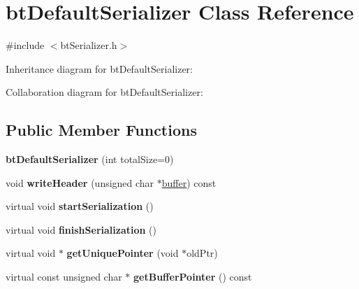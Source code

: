 \hypertarget{classbt_default_serializer}{\section{bt\+Default\+Serializer Class Reference}
\label{classbt_default_serializer}
}


{\ttfamily \#include $<$bt\+Serializer.\+h$>$}



Inheritance diagram for bt\+Default\+Serializer\+:


Collaboration diagram for bt\+Default\+Serializer\+:
\subsection*{Public Member Functions}
\begin{DoxyCompactItemize}
\item 
\hypertarget{classbt_default_serializer_a1c9914bdda6a6ca27be61adb8b44acb5}{{\bfseries bt\+Default\+Serializer} (int total\+Size=0)}\label{classbt_default_serializer_a1c9914bdda6a6ca27be61adb8b44acb5}

\item 
\hypertarget{classbt_default_serializer_a000269b382c986e7109eb3e4c8dddee4}{void {\bfseries write\+Header} (unsigned char $\ast$\hyperlink{structbuffer}{buffer}) const }\label{classbt_default_serializer_a000269b382c986e7109eb3e4c8dddee4}

\item 
\hypertarget{classbt_default_serializer_a4baf73f945f39b82b7a63482e51704ca}{virtual void {\bfseries start\+Serialization} ()}\label{classbt_default_serializer_a4baf73f945f39b82b7a63482e51704ca}

\item 
\hypertarget{classbt_default_serializer_aaf3755dc93e87cfd9b25103ce81ff452}{virtual void {\bfseries finish\+Serialization} ()}\label{classbt_default_serializer_aaf3755dc93e87cfd9b25103ce81ff452}

\item 
\hypertarget{classbt_default_serializer_a523b964568de9613eb3325583338c55b}{virtual void $\ast$ {\bfseries get\+Unique\+Pointer} (void $\ast$old\+Ptr)}\label{classbt_default_serializer_a523b964568de9613eb3325583338c55b}

\item 
\hypertarget{classbt_default_serializer_a613475ab9897399c8b468939707dbffc}{virtual const unsigned char $\ast$ {\bfseries get\+Buffer\+Pointer} () const }\label{classbt_default_serializer_a613475ab9897399c8b468939707dbffc}


\end{DoxyCompactItemize}

